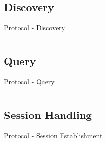 \documentclass[a4paper]{beamer}
\begin{document}
\subsection{Discovery}

\begin{frame}{Protocol - Discovery}
    \begin{columns}[t]
        \begin{column}{0.44\textwidth}
            
        \end{column}
        \begin{column}{0.44\textwidth}
            
        \end{column}
    \end{columns}
\end{frame}

\subsection{Query}

\begin{frame}{Protocol - Query}
    \begin{columns}[t]
        \begin{column}{0.44\textwidth}
        \end{column}
        \begin{column}{0.44\textwidth}
            
        \end{column}
    \end{columns}
\end{frame}

\subsection{Session Handling}

\begin{frame}{Protocol - Session Establishment}
    \begin{columns}[t]
        \begin{column}{0.48\textwidth}
            
        \end{column}
        \begin{column}{0.40\textwidth}
            
        \end{column}
    \end{columns}
\end{frame}
\end{document}
